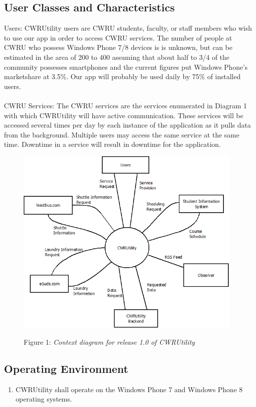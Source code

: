 \documentclass[pdftex,12pt,letter]{article}
\begin{document}
\subsection{User Classes and Characteristics}
\noindent Users: CWRUtility users are CWRU students, faculty, or staff members who wish to use our app in order to access CWRU services. The number of people at CWRU who possess Windows Phone 7/8 devices is is unknown, but can be estimated in the area of 200 to 400 assuming that about half to 3/4 of the community possesses smartphones and the current figures put Windows Phone's marketshare at 3.5\%. Our app will probably be used daily by 75\% of installed users.\\\\
CWRU Services:  The CWRU services are the services enumerated in Diagram 1 with which CWRUtility will have active communication. These services will be accessed several times per day by each instance of the application as it pulls data from the background. Multiple users may access the same service at the same time. Downtime in a service will result in downtime for the application.
\begin{figure}[h]
\begin{center}
\includegraphics[width=110mm]{ContextDiagram.png}\\
\caption{Figure 1: \emph{Context diagram for release 1.0 of CWRUtility}}
\end{center}
\end{figure}
\subsection{Operating Environment}
\begin{enumerate}[{O}E-1:]
\item CWRUtility shall operate on the Windows Phone 7 and Windows Phone 8 operating systems.
\end{enumerate}
\end{document}
